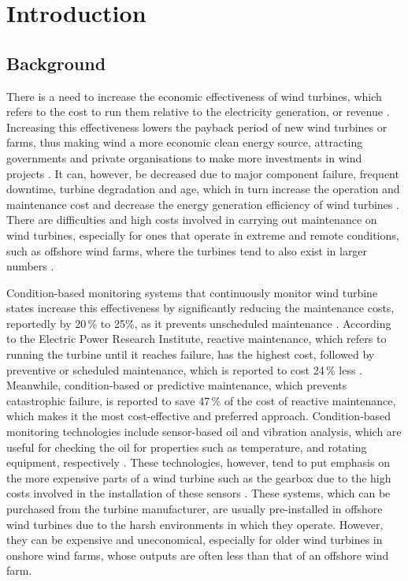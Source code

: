 \chapter{Introduction}\label{c1}

\section{Background}

There is a need to increase the economic effectiveness of wind turbines, which
refers to the cost to run them relative to the electricity generation, or
revenue \cite{Kim12,Leahy16}. Increasing this effectiveness lowers the payback
period of new wind turbines or farms, thus making wind a more economic clean
energy source, attracting governments and private organisations to make more
investments in wind projects \cite{Kim12}. It can, however, be decreased due
to major component failure, frequent downtime, turbine degradation and age,
which in turn increase the operation and maintenance cost and decrease the
energy generation efficiency of wind turbines \cite{Kim12,Diens16}. There are
difficulties and high costs involved in carrying out maintenance on wind
turbines, especially for ones that operate in extreme and remote conditions,
such as offshore wind farms, where the turbines tend to also exist in larger
numbers \cite{Diens16,Tautz17}.

Condition-based monitoring systems that continuously monitor wind turbine
states increase this effectiveness by significantly reducing the maintenance
costs, reportedly by 20\,\% to 25\.\%, as it prevents unscheduled maintenance
\cite{Leahy16}. According to the Electric Power Research Institute, reactive
maintenance, which refers to running the turbine until it reaches failure, has
the highest cost, followed by preventive or scheduled maintenance, which is
reported to cost 24\,\% less \cite{Wind15}. Meanwhile, condition-based or
predictive maintenance, which prevents catastrophic failure, \cite{Kim12} is
reported to save 47\,\% of the cost of reactive maintenance, \cite{Wind15}
which makes it the most cost-effective and preferred approach. Condition-based
monitoring technologies include sensor-based oil and vibration analysis, which
are useful for checking the oil for properties such as temperature, and
rotating equipment, respectively \cite{Garci12}. These technologies, however,
tend to put emphasis on the more expensive parts of a wind turbine such as the
gearbox \cite{Godwi13} due to the high costs involved in the installation of
these sensors \cite{Leahy16,Garci12}. These systems, which can be purchased
from the turbine manufacturer, are usually pre-installed in offshore wind
turbines due to the harsh environments in which they operate. However, they
can be expensive \cite{Tautz17} and uneconomical, especially for older wind
turbines in onshore wind farms, whose outputs are often less than that of an
offshore wind farm.

